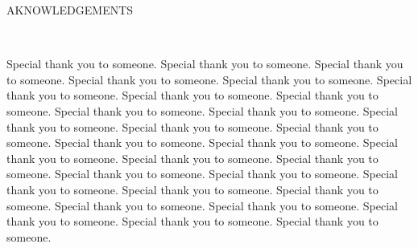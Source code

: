 \begin{singlespacing}
\begin{center}
\MakeUppercase{AKNOWLEDGEMENTS}\\
\end{center}
\end{singlespacing}

{
\setlength{\parskip}{1em}
\begin{doublespacing}
\begin{center}
\name\\
\end{center}
\end{doublespacing}
}

{
\begin{singlespacing}
\begin{flushleft}
\setlength{\parindent}{0.5in}
\setlength{\parskip}{1em}

\indent\indent Special thank you to someone. Special thank you to someone. Special thank you to someone. Special thank you to someone. Special thank you to someone. Special thank you to someone. Special thank you to someone. Special thank you to someone. Special thank you to someone. Special thank you to someone. Special thank you to someone. Special thank you to someone. Special thank you to someone. Special thank you to someone. Special thank you to someone. Special thank you to someone. Special thank you to someone. Special thank you to someone. Special thank you to someone. Special thank you to someone. Special thank you to someone. Special thank you to someone. Special thank you to someone. Special thank you to someone. Special thank you to someone. Special thank you to someone. Special thank you to someone. Special thank you to someone.


\phantom{This text will be invisible}
\end{flushleft}
\end{singlespacing}
}